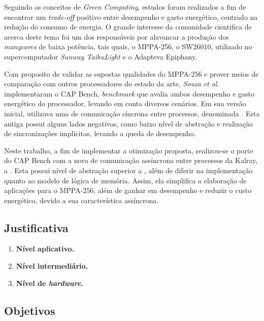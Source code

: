 \documentclass[a4paper,11pt]{article}
\newcommand{\etal}{\textit{et al}.\xspace}
\newcommand{\mppa}{MPPA-256\xspace}
\newcommand{\capb}{CAP Bench\xspace}
\newcommand{\epiphany}{Adapteva Epiphany\xspace}
\newcommand{\manycores}{\textit{manycores}\xspace}
\begin{document}
Seguindo os conceitos de \textit{Green Computing}, estudos foram realizados a fim de encontrar um \textit{trade-off} positivo entre desempenho e gasto energético, centrado na redução do consumo de energia. O grande interesse da comunidade cientifica de \hpc acerca deste tema foi um dos responsáveis por alavancar a produção dos \manycores de baixa potência, tais quais, o \mppa \cite{MPPA-2:2013}, o SW26010, utilizado no supercomputador \textit{Sunway TaihuLight} \cite{sunway:2016} e o \epiphany  \cite{Olofsson2014}.

Com proposito de validar as supostas qualidades do \mppa e prover meios de comparação com outros processadores do estado da arte, \textit{Souza} \etal implementaram o \capb \cite{Castro-Souza-CCPE:2016}, \textit{benchmark} que avalia ambos desempenho e gasto energético do processador, levando em conta diversos cenários. Em sua versão inicial, utilizava uma \api de comunicação síncrona entre processos, denominada \ipc \cite{MPPA-2:2013}. Esta antiga \api possui alguns lados negativos, como baixo nível de abstração e realização de sincronizações implícitas, levando a queda de desempenho.

Neste trabalho, a fim de implementar a otimização proposta, realizou-se o porte do \capb com a nova \api de comunicação assíncrona entre processos da Kalray, a \async \cite{Hascoet2017}. Esta \api possui nível de abstração superior a \ipc, além de diferir na implementação quanto ao modelo de lógica de memória. Assim, ela simplifica a elaboração de aplicações para o \mppa, além de ganhar em desempenho e reduzir o custo energético, devido a sua característica assíncrona.



\subsection{Justificativa}

\begin{enumerate}

	\item \textbf{Nível aplicativo.}
		
	\item \textbf{Nível intermediário.}
	
	\item \textbf{Nível de \emph{hardware}.} 
	
\end{enumerate}

\subsection{Objetivos}
\end{document}
